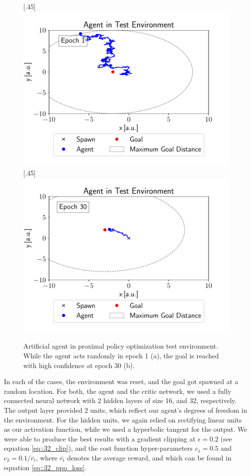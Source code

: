 \begin{figure}[h!]
	\centering
	[.45\linewidth]{\includegraphics[scale=.45]{chapters/11_autonomous_walking_experiments/img/epoch_1.pdf}}	
	[.45\linewidth]{\includegraphics[scale=.45]{chapters/11_autonomous_walking_experiments/img/epoch_30.pdf}}
	\caption{Artificial agent in proximal policy optimization test environment. While the agent acts randomly in epoch 1 (a), the goal is reached with high confidence at epoch 30 (b).}	
	\label{fig::431_ppo_env}
\end{figure} 
In each of the cases, the environment was reset, and the goal got spawned at a random location. For both, the agent and the critic network, we used a fully connected neural network with 2 hidden layers of size 16, and 32, respectively. The output layer provided 2 units, which reflect our agent's degrees of freedom in the environment. For the hidden units, we again relied on rectifying linear units as our activation function, while we used a hyperbolic tangent for the output. We were able to produce the best results with a gradient clipping at $\epsilon=0.2$ (see equation \ref{eq::32_clip}), and the cost function hyper-parameters $c_1 = 0.5$ and $c_2 = 0.1/\overline{r_t}$, where $\overline{r_t}$ denotes the average reward, and which can be found in equation \ref{eq::32_ppo_loss}. 
